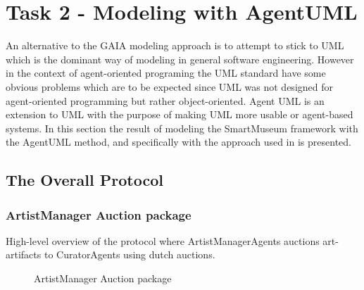 \documentclass[paper=letter, fontsize=12pt]{article}
\begin{document}
\section{Task 2 - Modeling with AgentUML}
An alternative to the GAIA modeling approach is to attempt to stick to UML which is the dominant way of modeling in general software engineering. However in the context of agent-oriented programing the UML standard have some obvious problems which are to be expected since UML was not designed for agent-oriented programming but rather object-oriented. Agent UML is an extension to UML with the purpose of making UML more usable or agent-based systems. In this section the result of modeling the SmartMuseum framework with the AgentUML method, and specifically with the approach used in \citep{agent_uml1} is presented.
\subsection{The Overall Protocol}
\subsubsection{ArtistManager Auction package}
High-level overview of the protocol where ArtistManagerAgents auctions art-artifacts to CuratorAgents using dutch auctions.
\begin{figure}[H]
  \begin{center}
    \caption{ArtistManager Auction package}
    \label{fig:artist_auction_template}
  \end{center}
\end{figure}
\end{document}
